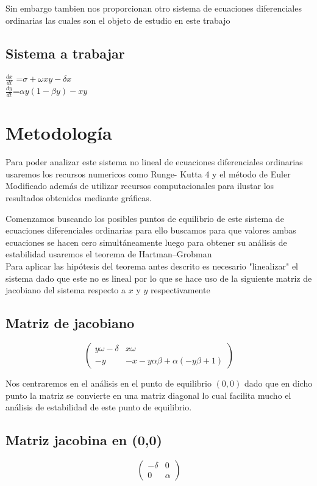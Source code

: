 \documentclass{article}
\begin{document}
Sin embargo tambien nos proporcionan otro sistema de ecuaciones diferenciales ordinarias las cuales son el objeto de estudio 
en este trabajo 
\centering
   \subsection*{Sistema a trabajar}
        $\frac{d x}{d t} $ =$\sigma + \omega xy-
            \delta x
            $
            \\
            $\frac{d y}{d t}$=$\alpha y(1-\beta y)-xy$

\section{Metodología}
\noindent 
  Para poder analizar este sistema no lineal de ecuaciones diferenciales ordinarias usaremos los recursos numericos como Runge-
  Kutta 4 y el método de Euler Modificado además de utilizar recursos computacionales para ilustar los resultados obtenidos mediante
  gráficas.
  
  Comenzamos buscando los posibles puntos de equilibrio de este sistema de ecuaciones diferenciales ordinarias
  para ello buscamos para que valores ambas ecuaciones se hacen cero simultáneamente luego para obtener su análisis de estabilidad
  usaremos el teorema de Hartman–Grobman\\
  Para aplicar las hipótesis del teorema antes descrito es necesario "linealizar" el sistema dado que este no 
  es lineal por lo que se hace uso de la siguiente matriz de jacobiano del sistema respecto a  $x$ y $y$ respectivamente
 \subsection*{Matriz de jacobiano}
    \[
    \left(
    \begin{array}{lc}
      y\omega-\delta & x\omega\\
      -y & -x-y\alpha\beta+\alpha(-y\beta+1)
    \end{array}
    \right)
    \]
  
  \centering  
  
  Nos centraremos en el análisis en el punto de equilibrio $(0,0)$ dado que en dicho punto la matriz se convierte en una
  matriz diagonal lo cual facilita mucho el análisis de estabilidad de este punto de equilibrio.
  \subsection*{Matriz jacobina en (0,0)}
    \[
    \left(
    \begin{array}{lc}
      -\delta & 0\\
      0 & \alpha
    \end{array}
    \right)
    \]
\end{document}
